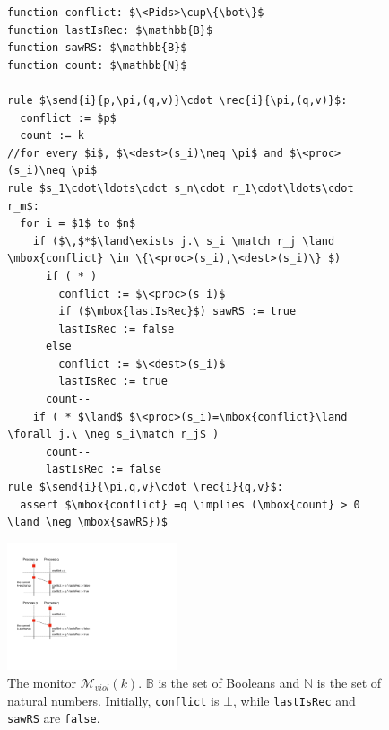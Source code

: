 \begin{figure}[t]
\begin{minipage}{6.5cm}
\begin{lstlisting}
function conflict: $\<Pids>\cup\{\bot\}$
function lastIsRec: $\mathbb{B}$
function sawRS: $\mathbb{B}$
function count: $\mathbb{N}$

rule $\send{i}{p,\pi,(q,v)}\cdot \rec{i}{\pi,(q,v)}$:
  conflict := $p$
  count := k
//for every $i$, $\<dest>(s_i)\neq \pi$ and $\<proc>(s_i)\neq \pi$
rule $s_1\cdot\ldots\cdot s_n\cdot r_1\cdot\ldots\cdot r_m$:
  for i = $1$ to $n$
    if ($\,$*$\land\exists j.\ s_i \match r_j \land \mbox{conflict} \in \{\<proc>(s_i),\<dest>(s_i)\} $)
      if ( * )
        conflict := $\<proc>(s_i)$
        if ($\mbox{lastIsRec}$) sawRS := true
        lastIsRec := false
      else 
        conflict := $\<dest>(s_i)$
        lastIsRec := true
      count--
    if ( * $\land$ $\<proc>(s_i)=\mbox{conflict}\land \forall j.\ \neg s_i\match r_j$ )
      count--
      lastIsRec := false
rule $\send{i}{\pi,q,v}\cdot \rec{i}{q,v}$:
  assert $\mbox{conflict} =q \implies (\mbox{count} > 0 \land \neg \mbox{sawRS})$
\end{lstlisting}
\end{minipage}
\hspace{5mm}
\begin{minipage}{5.5cm}
\includegraphics[width=5cm]{Borderline-mviol.pdf}
\end{minipage}
\vspace{-3mm}
\caption{The monitor $\mathcal{M}_{\mathit{viol}}(k)$. $\mathbb{B}$ is the set of Booleans and $\mathbb{N}$ is the set of natural numbers. Initially, {\tt conflict} is $\bot$, while {\tt lastIsRec} and {\tt sawRS} are {\tt false}.}
\label{fig:mon_viol}
\vspace{-5mm}
\end{figure}

